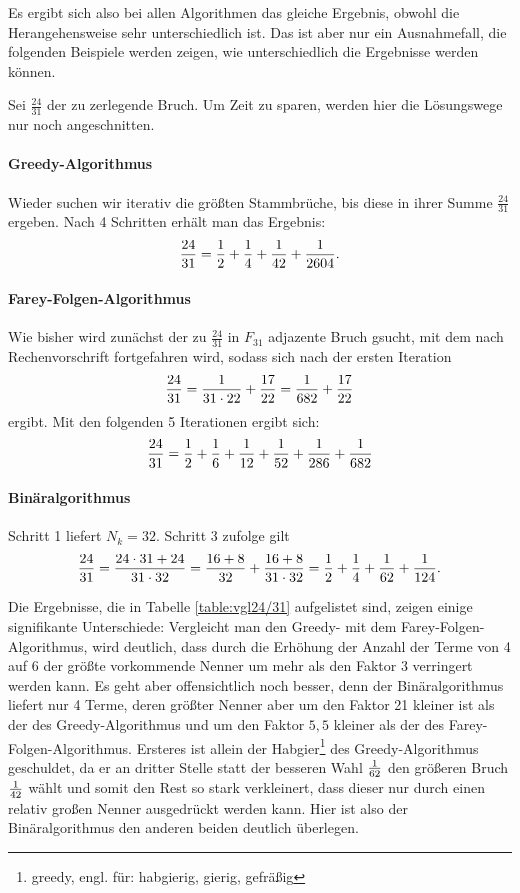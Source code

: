 Es ergibt sich also bei allen Algorithmen das gleiche Ergebnis, obwohl die Herangehensweise sehr unterschiedlich ist. Das ist aber nur ein Ausnahmefall, die folgenden Beispiele werden zeigen, wie unterschiedlich die Ergebnisse werden können.
\vspace{2cm}
\begin{bsp}
	Sei $\frac{24}{31}$ der zu zerlegende Bruch. Um Zeit zu sparen, werden hier die Lösungswege nur noch angeschnitten.
	
	\paragraph{Greedy-Algorithmus} Wieder suchen wir iterativ die größten Stammbrüche, bis diese in ihrer Summe $\frac{24}{31}$ ergeben. Nach 4 Schritten erhält man das Ergebnis:
	$$\frac{24}{31} = \frac{1}{2} + \frac{1}{4} + \frac{1}{42} + \frac{1}{2604}.$$
	
	\paragraph{Farey-Folgen-Algorithmus}Wie bisher wird zunächst der zu $\frac{24}{31}$ in $F_31$ adjazente Bruch gsucht, mit dem nach Rechenvorschrift fortgefahren wird, sodass sich nach der ersten Iteration
	$$\frac{24}{31}=\frac{1}{31 \cdot 22}+ \frac{17}{22} = \frac{1}{682} + \frac{17}{22}$$
	ergibt. Mit den folgenden 5 Iterationen ergibt sich:
	$$\frac{24}{31}=\frac{1}{2}+\frac{1}{6}+\frac{1}{12}+\frac{1}{52}+\frac{1}{286}+\frac{1}{682}$$
	
	\paragraph{Binäralgorithmus}Schritt 1 liefert $N_k = 32$. Schritt 3 zufolge gilt
	$$\frac{24}{31} = \frac{24 \cdot 31 + 24}{31\cdot32} = \frac{16+8}{32} + \frac{16+8}{31 \cdot 32} = \frac{1}{2} + \frac{1}{4} + \frac{1}{62} + \frac{1}{124}.$$
	
	Die Ergebnisse, die in Tabelle \ref{table:vgl24/31} aufgelistet sind, zeigen einige signifikante Unterschiede: Vergleicht man den Greedy- mit dem Farey-Folgen-Algorithmus,  wird deutlich, dass durch die Erhöhung der Anzahl der Terme von 4 auf 6 der größte vorkommende Nenner um mehr als den Faktor 3 verringert werden kann. Es geht aber offensichtlich noch besser, denn der Binäralgorithmus liefert nur 4 Terme, deren größter Nenner aber um den Faktor 21 kleiner ist als der des Greedy-Algorithmus und um den Faktor $5,5$ kleiner als der des Farey-Folgen-Algorithmus. Ersteres ist allein der Habgier\footnote{greedy, engl. für: habgierig, gierig, gefräßig} des Greedy-Algorithmus geschuldet, da er an dritter Stelle statt der besseren Wahl $\frac{1}{62}$ den größeren Bruch $\frac{1}{42}$ wählt und somit den Rest so stark verkleinert, dass dieser nur durch einen relativ großen Nenner ausgedrückt werden kann. Hier ist also der Binäralgorithmus den anderen beiden deutlich überlegen.
\end{bsp}

